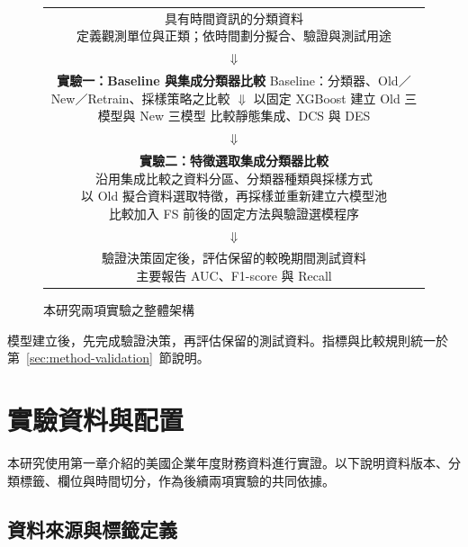 \begin{figure}[htbp]
\centering
\begingroup
\small
{}
\setlength{\fboxsep}{8pt}
\begin{tabular}{@{}c@{}}
\fbox{\parbox{0.88\linewidth}{\centering 具有時間資訊的分類資料\\
定義觀測單位與正類；依時間劃分擬合、驗證與測試用途}}\\[3pt]
\(\Downarrow\)\\[3pt]
\fbox{\parbox{0.88\linewidth}{\centering\textbf{實驗一：Baseline 與集成分類器比較}\\[4pt]
Baseline：分類器、Old／New／Retrain、採樣策略之比較\\
\(\Downarrow\)\\
以固定 XGBoost 建立 Old 三模型與 New 三模型\\
比較靜態集成、DCS 與 DES}}\\[3pt]
\(\Downarrow\)\\[3pt]
\fbox{\parbox{0.88\linewidth}{\centering\textbf{實驗二：特徵選取集成分類器比較}\\[4pt]
沿用集成比較之資料分區、分類器種類與採樣方式\\
以 Old 擬合資料選取特徵，再採樣並重新建立六模型池\\
比較加入 FS 前後的固定方法與驗證選模程序}}\\[3pt]
\(\Downarrow\)\\[3pt]
\fbox{\parbox{0.88\linewidth}{\centering 驗證決策固定後，評估保留的較晚期間測試資料\\
主要報告 AUC、F1-score 與 Recall}}
\end{tabular}
\endgroup
\caption{本研究兩項實驗之整體架構}\label{fig:method-overview}
\par{}
\end{figure}

模型建立後，先完成驗證決策，再評估保留的測試資料。指標與比較規則統一於第~\ref{sec:method-validation}~節說明。

\clearpage
\section{實驗資料與配置}\label{sec:method-data}

本研究使用第一章介紹的美國企業年度財務資料進行實證。以下說明資料版本、分類標籤、欄位與時間切分，作為後續兩項實驗的共同依據。

\subsection{資料來源與標籤定義}\label{sec:method-label}


